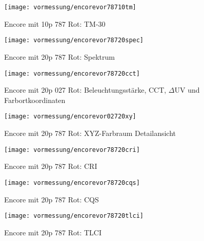 \documentclass[pagesize,paper=A4,fontsize=12pt,utf8,numbers=noenddot,bibliography=totoc,listof=totoc,DIV=11,BCOR=1mm]{scrreprt}
\begin{document}
\begin{figure}[htp]     %
\centering
\texttt{[image: vormessung/encorevor78710tm]} 
\caption {Encore mit 10p 787 Rot: TM-30} 
\end{figure}




\begin{figure}[htp]     %
\centering
\texttt{[image: vormessung/encorevor78720spec]} 
\caption {Encore mit 20p 787 Rot: Spektrum} 
\end{figure}

\begin{figure}[htp]     %
\centering
\texttt{[image: vormessung/encorevor78720cct]} 
\caption {Encore mit 20p 027 Rot: Beleuchtungsstärke, CCT, $\Delta$UV und Farbortkoordinaten} 
\end{figure}

\begin{figure}[htp]     %
\centering
\texttt{[image: vormessung/encorevor02720xy]} 
\caption {Encore mit 20p 787 Rot: XYZ-Farbraum Detailansicht} 
\end{figure}

\begin{figure}[htp]     %
\centering
\texttt{[image: vormessung/encorevor78720cri]} 
\caption {Encore mit 20p 787 Rot: CRI} 
\end{figure}

\begin{figure}[htp]     %
\centering
\texttt{[image: vormessung/encorevor78720cqs]} 
\caption {Encore mit 20p 787 Rot: CQS} 
\end{figure}

\begin{figure}[htp]     %
\centering
\texttt{[image: vormessung/encorevor78720tlci]} 
\caption {Encore mit 20p 787 Rot: TLCI} 
\end{figure}
\end{document}

